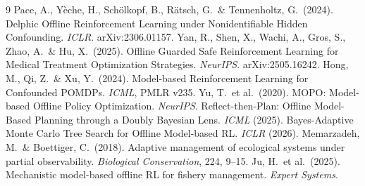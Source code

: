 \documentclass[11pt]{article}
\begin{document}
\begin{thebibliography}{9}
 Pace, A., Y\`eche, H., Sch\"olkopf, B., R\"atsch, G.\ \& Tennenholtz, G.\ (2024).
Delphic Offline Reinforcement Learning under Nonidentifiable Hidden Confounding. \emph{ICLR}. arXiv:2306.01157.
 Yan, R., Shen, X., Wachi, A., Gros, S., Zhao, A.\ \& Hu, X.\ (2025).
Offline Guarded Safe Reinforcement Learning for Medical Treatment Optimization Strategies. \emph{NeurIPS}. arXiv:2505.16242.
 Hong, M., Qi, Z.\ \& Xu, Y.\ (2024).
Model-based Reinforcement Learning for Confounded POMDPs. \emph{ICML}, PMLR v235.
 Yu, T.\ et al.\ (2020). MOPO: Model-based Offline Policy Optimization. \emph{NeurIPS}.
 Reflect-then-Plan: Offline Model-Based Planning through a Doubly Bayesian Lens. \emph{ICML} (2025).
 Bayes-Adaptive Monte Carlo Tree Search for Offline Model-based RL. \emph{ICLR} (2026).
 Memarzadeh, M.\ \& Boettiger, C.\ (2018). Adaptive management of ecological systems under partial observability. \emph{Biological Conservation}, 224, 9--15.
 Ju, H.\ et al.\ (2025). Mechanistic model-based offline RL for fishery management. \emph{Expert Systems}.
\end{thebibliography}
\end{document}
